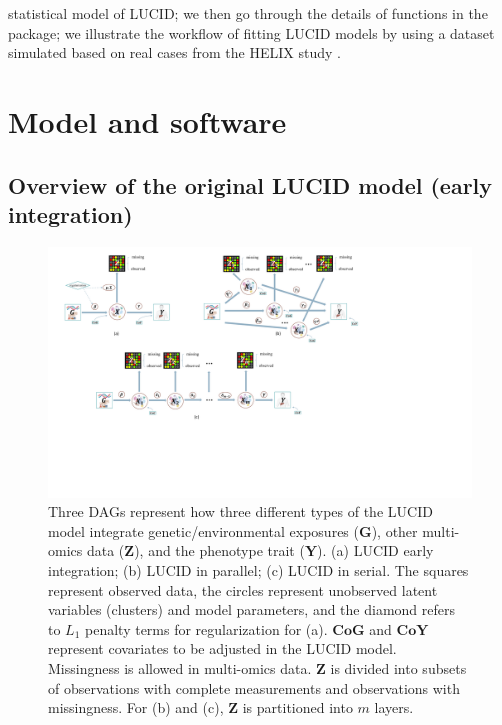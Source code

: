 statistical model of LUCID; we then go through the details of functions in the  package; we illustrate the workflow of fitting LUCID models by using a dataset simulated based on real cases from the HELIX study \citep{vrijheid2014human, maitre2022state}.


\section{Model and software} \label{sec2}


\subsection{Overview of the original LUCID model (early integration)} \label{sec2.1}

\begin{figure}
    \centering
    \includegraphics[scale = 0.31]{figures/fig1.pdf}
    \caption{Three DAGs represent how three different types of the LUCID model integrate genetic/environmental exposures ($\bm G$), other multi-omics data ($\bm Z$), and the phenotype trait ($\bm Y$). (a) LUCID early integration; (b) LUCID in parallel; (c) LUCID in serial. The squares represent observed data, the circles represent unobserved latent variables (clusters) and model parameters, and the diamond refers to $L_1$ penalty terms for regularization for (a). $\bm {CoG}$ and $\bm {CoY}$ represent covariates to be adjusted in the LUCID model. Missingness is allowed in multi-omics data. $\bm Z$ is divided into subsets of observations with complete measurements and observations with missingness. For (b) and (c), $\bm Z$ is partitioned into $m$ layers.}
    \label{fig1}
\end{figure}

